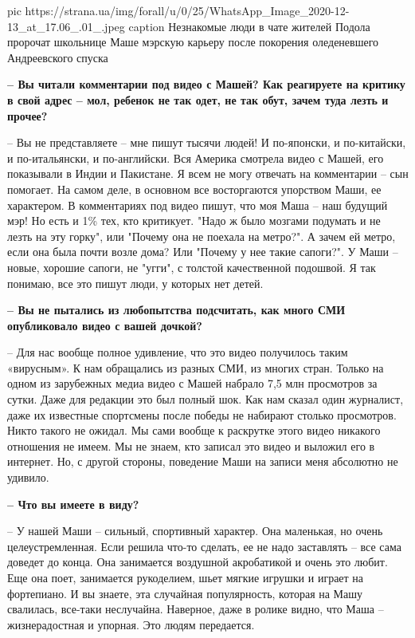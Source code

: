 \ifcmt
pic https://strana.ua/img/forall/u/0/25/WhatsApp_Image_2020-12-13_at_17.06_.01_.jpeg
caption Незнакомые люди в чате жителей Подола пророчат школьнице Маше мэрскую карьеру после покорения оледеневшего Андреевского спуска
\fi

\textbf{– Вы читали комментарии под видео с Машей? Как реагируете на критику в свой адрес – мол, ребенок не так одет, не так обут, зачем туда лезть и прочее?}
 
– Вы не представляете – мне пишут тысячи людей! И по-японски, и по-китайски, и
по-итальянски, и по-английски. Вся Америка смотрела видео с Машей, его
показывали в Индии и Пакистане. Я всем не могу отвечать на комментарии – сын
помогает. На самом деле, в основном все восторгаются упорством Маши, ее
характером. В комментариях под видео пишут, что моя Маша – наш будущий мэр! Но
есть и 1\% тех, кто критикует. "Надо ж было мозгами подумать и не лезть на эту
горку", или "Почему она не поехала на метро?". А зачем ей метро, если она была
почти возле дома? Или "Почему у нее такие сапоги?". У Маши – новые, хорошие
сапоги, не "угги", с толстой качественной подошвой. Я так понимаю, все это
пишут люди, у которых нет детей.

\textbf{– Вы не пытались из любопытства подсчитать, как много СМИ опубликовало видео с
вашей дочкой?}

– Для нас вообще полное удивление, что это видео получилось таким «вирусным». К
нам обращались из разных СМИ, из многих стран. Только на одном из зарубежных
медиа видео с Машей набрало 7,5 млн  просмотров за сутки. Даже для редакции это
был полный шок. Как нам сказал один журналист, даже их известные спортсмены
после победы не набирают столько просмотров. Никто такого не ожидал. Мы сами
вообще к раскрутке этого видео никакого отношения не имеем. Мы не знаем, кто
записал это видео и выложил его в интернет. Но, с другой стороны, поведение
Маши на записи меня абсолютно не удивило. 

\textbf{– Что вы имеете в виду?}
 
– У нашей Маши – сильный, спортивный характер. Она маленькая, но очень
целеустремленная. Если решила что-то сделать, ее не надо заставлять – все сама
доведет до конца. Она занимается воздушной акробатикой и очень это любит. Еще
она поет, занимается рукоделием, шьет мягкие игрушки и играет на фортепиано. И
вы знаете, эта случайная популярность, которая на Машу свалилась, все-таки
неслучайна. Наверное, даже в ролике видно, что Маша – жизнерадостная и упорная.
Это людям передается.

